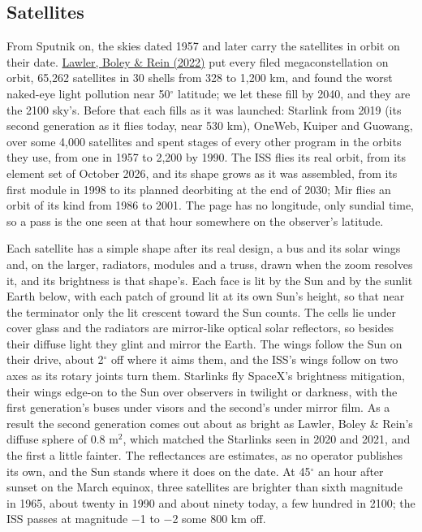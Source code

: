 \documentclass[9pt,twocolumn]{extarticle}
\begin{document}
\subsection{Satellites}\label{satellites}

From Sputnik on, the skies dated 1957 and later carry the satellites in orbit on their date. \protect\hyperlink{cite.lawler2022}{Lawler, Boley \& Rein (2022)} put every filed megaconstellation on orbit, 65,262 satellites in 30 shells from 328 to 1,200 km, and found the worst naked-eye light pollution near 50$^\circ$ latitude; we let these fill by 2040, and they are the 2100 sky's. Before that each fills as it was launched: Starlink from 2019 (its second generation as it flies today, near 530 km), OneWeb, Kuiper and Guowang, over some 4,000 satellites and spent stages of every other program in the orbits they use, from one in 1957 to 2,200 by 1990. The ISS flies its real orbit, from its element set of October 2026, and its shape grows as it was assembled, from its first module in 1998 to its planned deorbiting at the end of 2030; Mir flies an orbit of its kind from 1986 to 2001. The page has no longitude, only sundial time, so a pass is the one seen at that hour somewhere on the observer's latitude.

Each satellite has a simple shape after its real design, a bus and its solar wings and, on the larger, radiators, modules and a truss, drawn when the zoom resolves it, and its brightness is that shape's. Each face is lit by the Sun and by the sunlit Earth below, with each patch of ground lit at its own Sun's height, so that near the terminator only the lit crescent toward the Sun counts. The cells lie under cover glass and the radiators are mirror-like optical solar reflectors, so besides their diffuse light they glint and mirror the Earth. The wings follow the Sun on their drive, about 2$^\circ$ off where it aims them, and the ISS's wings follow on two axes as its rotary joints turn them. Starlinks fly SpaceX's brightness mitigation, their wings edge-on to the Sun over observers in twilight or darkness, with the first generation's buses under visors and the second's under mirror film. As a result the second generation comes out about as bright as Lawler, Boley \& Rein's diffuse sphere of 0.8 m$^{2}$, which matched the Starlinks seen in 2020 and 2021, and the first a little fainter. The reflectances are estimates, as no operator publishes its own, and the Sun stands where it does on the date. At 45$^\circ$ an hour after sunset on the March equinox, three satellites are brighter than sixth magnitude in 1965, about twenty in 1990 and about ninety today, a few hundred in 2100; the ISS passes at magnitude $-$1 to $-$2 some 800 km off.
\end{document}
